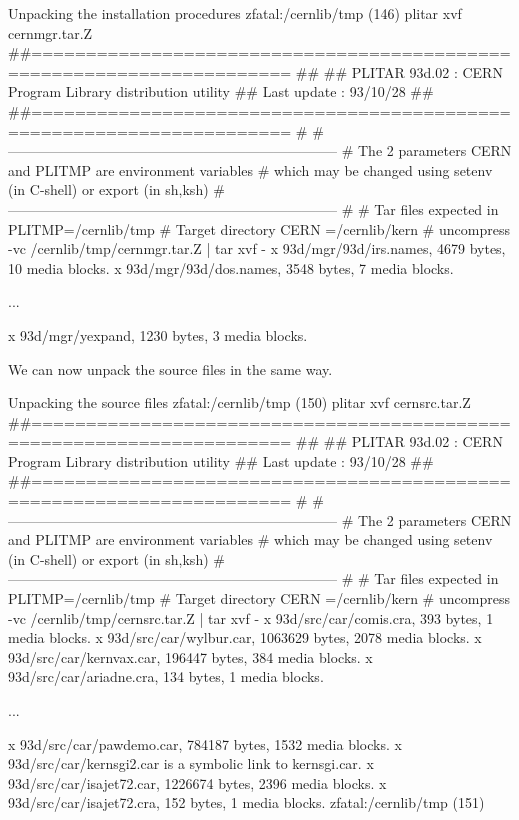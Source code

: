 \begin{XMPt}{Unpacking the installation procedures}
zfatal:/cernlib/tmp (146) plitar xvf cernmgr.tar.Z   
##======================================================================
##
## PLITAR   93d.02  : CERN Program Library distribution utility
## Last update      : 93/10/28
##
##======================================================================
#
# -----------------------------------------------------------------------
# The 2 parameters CERN and PLITMP are environment variables
# which may be changed using setenv (in C-shell) or export (in sh,ksh)
# -----------------------------------------------------------------------
#
# Tar files expected in      PLITMP=/cernlib/tmp
# Target directory           CERN  =/cernlib/kern
#
         uncompress -vc /cernlib/tmp/cernmgr.tar.Z |  tar xvf  -
x 93d/mgr/93d/irs.names, 4679 bytes, 10 media blocks.
x 93d/mgr/93d/dos.names, 3548 bytes, 7 media blocks.

...

x 93d/mgr/yexpand, 1230 bytes, 3 media blocks.


\end{XMPt}

We can now unpack the source files in the same way.

\begin{XMPt}{Unpacking the source files}
zfatal:/cernlib/tmp (150) plitar xvf cernsrc.tar.Z
##======================================================================
##
## PLITAR   93d.02  : CERN Program Library distribution utility
## Last update      : 93/10/28
##
##======================================================================
#
# -----------------------------------------------------------------------
# The 2 parameters CERN and PLITMP are environment variables
# which may be changed using setenv (in C-shell) or export (in sh,ksh)
# -----------------------------------------------------------------------
#
# Tar files expected in      PLITMP=/cernlib/tmp
# Target directory           CERN  =/cernlib/kern
#
         uncompress -vc /cernlib/tmp/cernsrc.tar.Z |  tar xvf  -
x 93d/src/car/comis.cra, 393 bytes, 1 media blocks.
x 93d/src/car/wylbur.car, 1063629 bytes, 2078 media blocks.
x 93d/src/car/kernvax.car, 196447 bytes, 384 media blocks.
x 93d/src/car/ariadne.cra, 134 bytes, 1 media blocks.

...

x 93d/src/car/pawdemo.car, 784187 bytes, 1532 media blocks.
x 93d/src/car/kernsgi2.car is a symbolic link to kernsgi.car.
x 93d/src/car/isajet72.car, 1226674 bytes, 2396 media blocks.
x 93d/src/car/isajet72.cra, 152 bytes, 1 media blocks.
zfatal:/cernlib/tmp (151) 

\end{XMPt}

